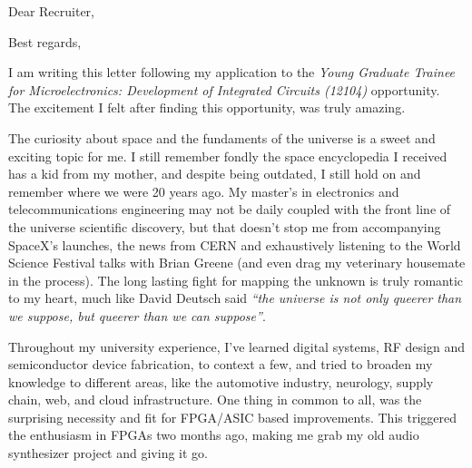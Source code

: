 \documentclass[11pt,a4paper,roman]{moderncv}
\begin{document}
\date{\today}
\opening{Dear Recruiter,}
\closing{Best regards,}
\makelettertitle



I am writing this letter following my application to the \emph{Young Graduate Trainee for Microelectronics: Development of Integrated Circuits (12104)} opportunity.
The excitement I felt after finding this opportunity, was truly amazing. 


The curiosity about space and the fundaments of the universe is a sweet and exciting topic for me. I still remember fondly the space encyclopedia I received has a kid from my mother, and despite being outdated, I still hold on and remember where we were 20 years ago.
My master's in electronics and telecommunications engineering may not be daily coupled with the front line of the universe scientific discovery, but that doesn't stop me from accompanying SpaceX's launches, the news from CERN and  exhaustively listening to the World Science Festival talks with Brian Greene (and even drag my veterinary housemate in the process).
The long lasting fight for mapping the unknown is truly romantic to my heart, much like David Deutsch said \textit{``the universe is not only queerer than we suppose, but queerer than we can suppose''}.

Throughout my university experience, I've learned digital systems, RF design and semiconductor device fabrication, to context a few, and tried to broaden my knowledge to different areas, like the automotive industry, neurology, supply chain, web, and cloud infrastructure. One thing in common to all, was the surprising necessity and fit for FPGA/ASIC based improvements.
This triggered the enthusiasm in FPGAs two months ago, making me grab my old audio synthesizer project and giving it go.
\end{document}
